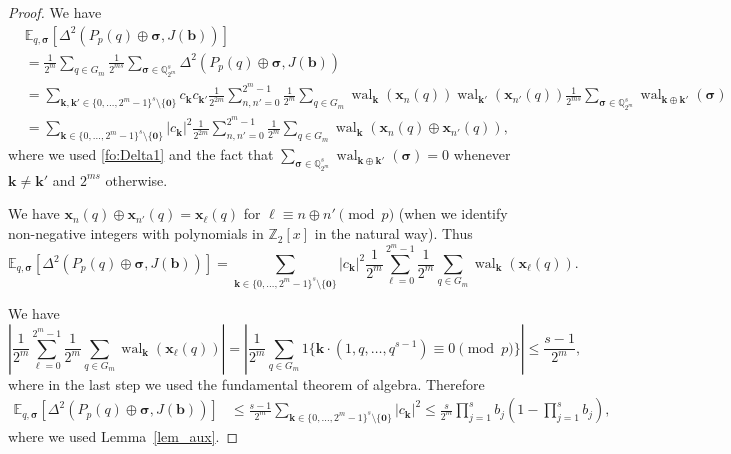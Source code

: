 \documentclass[10pt,a4paper]{amsart}
\begin{document}
\begin{proof}
We have
\begin{align*}
& \mathbb{E}_{q, \bm{\sigma}}[ \Delta^2(P_p(q) \oplus \bm{\sigma}, J(\bm{b}))] \\ 
& = \frac{1}{2^{m}}  \sum_{q \in G_m} \frac{1}{2^{ms}} \sum_{\bm{\sigma} \in \mathbb{Q}_{2^m}^s} \Delta^2(P_p(q) \oplus \bm{\sigma},J(\bm{b})) \\ 
& =  \sum_{\bm{k}, \bm{k}' \in \{0, \ldots, 2^{m}-1\}^s \setminus \{\bm{0}\}}  c_{\bm{k}} c_{\bm{k}'} \frac{1}{2^{2m}} \sum_{n, n' =0}^{2^m-1} \frac{1}{2^{m}} \sum_{q \in G_m}  \operatorname{wal}_{\bm{k}}(\bm{x}_n(q)) \operatorname{wal}_{\bm{k}'}(\bm{x}_{n'}(q)) \frac{1}{2^{ms}} \sum_{\bm{\sigma} \in \mathbb{Q}_{2^m}^s} \operatorname{wal}_{\bm{k} \oplus \bm{k}'}(\bm{\sigma}) \\ 
& =  \sum_{\bm{k} \in \{0, \ldots, 2^{m}-1\}^s \setminus \{\bm{0}\}}  | c_{\bm{k}} |^2  \frac{1}{2^{2m}} 
\sum_{n, n'=0}^{2^m-1} \frac{1}{2^{m}} \sum_{q \in G_m} \operatorname{wal}_{\bm{k}}(\bm{x}_n(q) \oplus \bm{x}_{n'}(q)),
\end{align*}
where we used \eqref{fo:Delta1} and the fact that $\sum_{\bm{\sigma} \in \mathbb{Q}_{2^m}^s} \operatorname{wal}_{\bm{k} \oplus \bm{k}'}(\bm{\sigma})=0$ whenever $\bm{k} \not=\bm{k}'$ and $2^{ms}$ otherwise. 

We have $\bm{x}_n(q) \oplus \bm{x}_{n'}(q) = \bm{x}_{\ell}(q)$ for $\ell \equiv n \oplus n' \pmod{p}$ (when we identify non-negative integers with polynomials in $\mathbb{Z}_2[x]$ in the natural way). Thus
\begin{equation*}%
\mathbb{E}_{q, \bm{\sigma}}[\Delta^2(P_p(q) \oplus \bm{\sigma}, J(\bm{b}))] =  \sum_{\bm{k} \in \{0, \ldots, 2^{m}-1\}^s \setminus \{\bm{0}\}}  | c_{\bm{k}} |^2  \frac{1}{2^{m}} 
\sum_{\ell =0}^{2^m-1} \frac{1}{2^{m}} \sum_{q \in G_m} \operatorname{wal}_{\bm{k}}(\bm{x}_\ell(q)).
\end{equation*}

We have
\begin{equation*}
\left| \frac{1}{2^m} \sum_{\ell=0}^{2^m-1} \frac{1}{2^m} \sum_{q \in G_m} \operatorname{wal}_{\bm{k}}(\bm{x}_\ell(q)) \right| = \left| \frac{1}{2^m} \sum_{q \in G_m} 1\{ \bm{k} \cdot (1, q, \ldots, q^{s-1}) \equiv 0 \pmod{p} \} \right| \le \frac{s-1}{2^m},
\end{equation*}
where in the last step we used the fundamental theorem of algebra. Therefore
\begin{align*}
\mathbb{E}_{q, \bm{\sigma}}[\Delta^2(P_p(q) \oplus \bm{\sigma}, J(\bm{b}))] & \le  \frac{s-1}{2^m} \sum_{\bm{k} \in \{0, \ldots, 2^{m}-1\}^s \setminus \{\bm{0}\}}  | c_{\bm{k}} |^2   \le \frac{s}{2^m} \prod_{j=1}^s b_j  \left( 1 - \prod_{j=1}^s b_j \right),
\end{align*}
where we used  Lemma~\ref{lem_aux}.
\end{proof}
\end{document}
